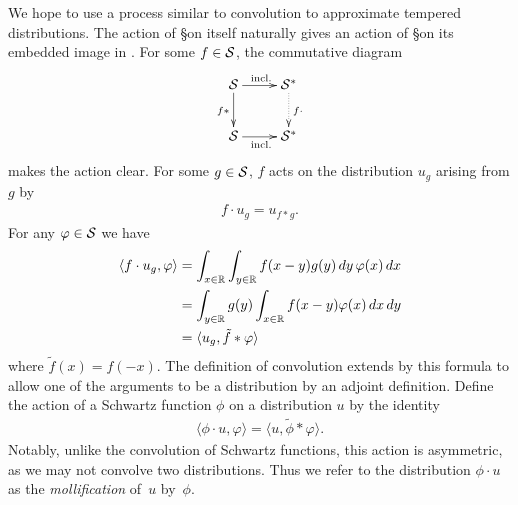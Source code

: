     We hope to use a process similar to convolution to approximate tempered distributions.
    The action of \S on itself naturally gives an action of \S on its embedded image in \SS.
    For some $f\in\S$, the commutative diagram  
    \begin{displaymath}
      \xymatrix{
        \S \ar[r]^{\text{incl.}} \ar[d]_{f*} & \SS \ar@{..>}[d]^{f\cdot}
        \\ \S \ar[r]_{\text{incl.}} & \SS
      }
    \end{displaymath}
    makes the action clear.
    For some $g\in\S$, $f$ acts on the distribution $u_g$ arising from $g$ by
    \begin{align*}
      f\cdot u_g = u_{f*g} \text{.}
    \end{align*}
    For any $\varphi\in\S$ we have
    \begin{align*}
      \langle f\cdot u_g, \varphi\rangle
      &= \int_{x\in\R} \int_{y\in\R} f(x-y)g(y)\,dy\,\varphi(x)\,dx
      \\&= \int_{y\in\R} g(y) \int_{x\in\R} f(x-y)\varphi(x)\,dx\,dy
      \\&= \langle u_g, \tilde f*\varphi\rangle
    \end{align*}
    where $\tilde f(x) = f(-x)$.
    The definition of convolution extends by this formula to allow one of the arguments to be a distribution by an adjoint definition.
    Define the action of a Schwartz function $\phi$ on a distribution $u$ by the identity
    \begin{align*}
      \langle \phi\cdot u, \varphi\rangle
      = \langle u, \tilde\phi*\varphi\rangle \text{.}
    \end{align*}
    Notably, unlike the convolution of Schwartz functions, this action is asymmetric, as we may not convolve two distributions.
    Thus we refer to the distribution $\phi\cdot u$ as the \emph{mollification} of~$u$ by~$\phi$.

